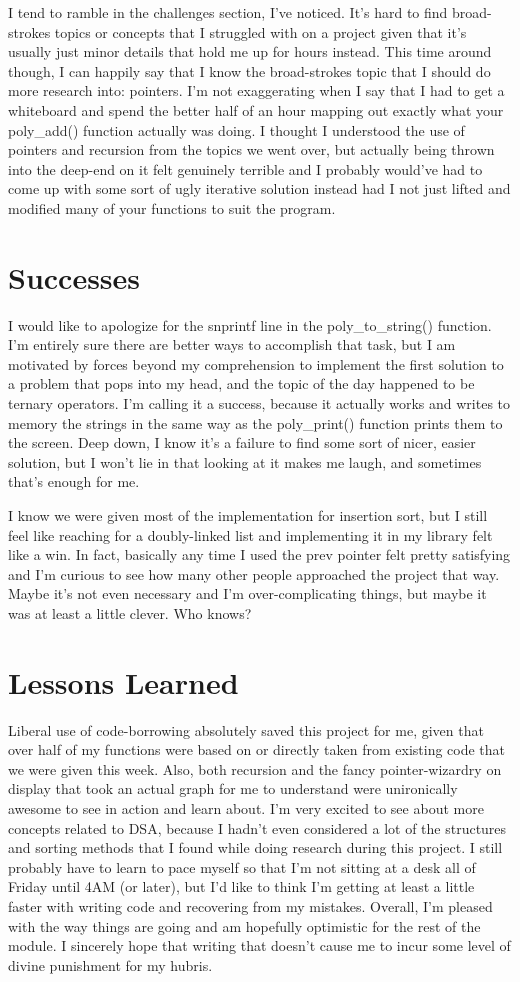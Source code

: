 \documentclass[11pt]{report}
\begin{document}
I tend to ramble in the challenges section, I've noticed. It's hard to find broad-strokes topics or concepts that I struggled with on a project given that it's usually just minor details that hold me up for hours instead. This time around though, I can happily say that I know the broad-strokes topic that I should do more research into: pointers. I'm not exaggerating when I say that I had to get a whiteboard and spend the better half of an hour mapping out exactly what your poly\_add() function actually was doing. I thought I understood the use of pointers and recursion from the topics we went over, but actually being thrown into the deep-end on it felt genuinely terrible and I probably would've had to come up with some sort of ugly iterative solution instead had I not just lifted and modified many of your functions to suit the program.
\section*{Successes}
I would like to apologize for the snprintf line in the poly\_to\_string() function. I'm entirely sure there are better ways to accomplish that task, but I am motivated by forces beyond my comprehension to implement the first solution to a problem that pops into my head, and the topic of the day happened to be ternary operators. I'm calling it a success, because it actually works and writes to memory the strings in the same way as the poly\_print() function prints them to the screen. Deep down, I know it's a failure to find some sort of nicer, easier solution, but I won't lie in that looking at it makes me laugh, and sometimes that's enough for me.

I know we were given most of the implementation for insertion sort, but I still feel like reaching for a doubly-linked list and implementing it in my library felt like a win. In fact, basically any time I used the prev pointer felt pretty satisfying and I'm curious to see how many other people approached the project that way. Maybe it's not even necessary and I'm over-complicating things, but maybe it was at least a little clever. Who knows? 
\section*{Lessons Learned}
Liberal use of code-borrowing absolutely saved this project for me, given that over half of my functions were based on or directly taken from existing code that we were given this week. Also, both recursion and the fancy pointer-wizardry on display that took an actual graph for me to understand were unironically awesome to see in action and learn about. I'm very excited to see about more concepts related to DSA, because I hadn't even considered a lot of the structures and sorting methods that I found while doing research during this project. I still probably have to learn to pace myself so that I'm not sitting at a desk all of Friday until 4AM (or later), but I'd like to think I'm getting at least a little faster with writing code and recovering from my mistakes. Overall, I'm pleased with the way things are going and am hopefully optimistic for the rest of the module. I sincerely hope that writing that doesn't cause me to incur some level of divine punishment for my hubris.
\end{document}
